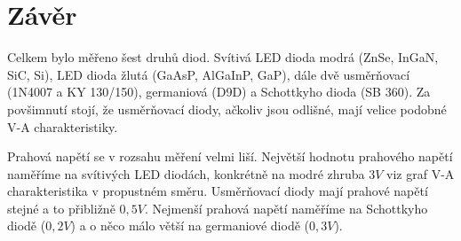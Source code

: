 \documentclass[12pt]{article} %
\begin{document}
\section{Závěr}
Celkem bylo měřeno šest druhů diod. Svítivá LED dioda modrá (ZnSe, InGaN, SiC, Si), LED dioda žlutá (GaAsP, AlGaInP, GaP), dále dvě usměrňovací (1N4007 a KY 130/150), germaniová (D9D) a Schottkyho dioda (SB 360). Za povšimnutí stojí, že usměrňovací diody, ačkoliv jsou odlišné, mají velice podobné V-A charakteristiky.

Prahová napětí se v rozsahu měření velmi liší. Největší hodnotu prahového napětí naměříme na svítivých LED diodách, konkrétně na modré zhruba $3V$ viz graf V-A charakteristika v propustném směru. Usměrňovací diody mají prahové napětí stejné a to přibližně $0,5V$. Nejmenší prahová napětí naměříme na Schottkyho diodě ($0,2V$) a o něco málo větší na germaniové diodě ($0,3V$).
\end{document}
